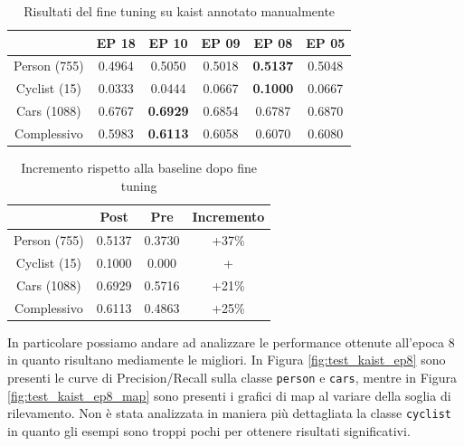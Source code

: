 \begin{table}[]
    \centering
    \begin{tabular}{c|c|c|c|c|c|}
    \cline{2-6}
     & EP 18 & EP 10 & EP 09 & EP 08 & EP 05 \\ \hline
    \multicolumn{1}{|c|}{Person (755)} & 0.4964 & 0.5050 & 0.5018 & \textbf{0.5137} & 0.5048 \\ \hline
    \multicolumn{1}{|c|}{Cyclist (15)} & 0.0333 & 0.0444 & 0.0667 & \textbf{0.1000} & 0.0667 \\ \hline
    \multicolumn{1}{|c|}{Cars (1088)} & 0.6767 & \textbf{0.6929} & 0.6854 & 0.6787 & 0.6870 \\ \hline
    \multicolumn{1}{|c|}{Complessivo} & 0.5983 & \textbf{0.6113} & 0.6058 & 0.6070 & 0.6080 \\ \hline
    \end{tabular}
    \caption{Risultati del fine tuning su kaist annotato manualmente}
    \label{tab:fine_tuning_kaist_flir}
\end{table}
\begin{table}[]
    \centering
    \begin{tabular}{c|c|c|c|}
    \cline{2-4}
     & Post & Pre & Incremento \\ \hline
    \multicolumn{1}{|c|}{Person (755)} & 0.5137 & 0.3730 & +37\% \\ \hline
    \multicolumn{1}{|c|}{Cyclist (15)} & 0.1000 & 0.000 & + \\ \hline
    \multicolumn{1}{|c|}{Cars (1088)} & 0.6929 & 0.5716 & +21\% \\ \hline
    \multicolumn{1}{|c|}{Complessivo} & 0.6113 & 0.4863 & +25\% \\ \hline
    \end{tabular}
    \caption{Incremento rispetto alla baseline dopo fine tuning}
    \label{tab:fine_tuning_kaist_flir_increment}
\end{table}

In particolare possiamo andare ad analizzare le performance ottenute all'epoca 8 in quanto risultano mediamente le migliori. In Figura \ref{fig:test_kaist_ep8} sono presenti le curve di Precision/Recall sulla classe \texttt{person} e \texttt{cars}, mentre in Figura \ref{fig:test_kaist_ep8_map} sono presenti i grafici di \ac{map} al variare della soglia di rilevamento. Non è stata analizzata in maniera più dettagliata la classe \texttt{cyclist} in quanto gli esempi sono troppi pochi per ottenere risultati significativi. 

